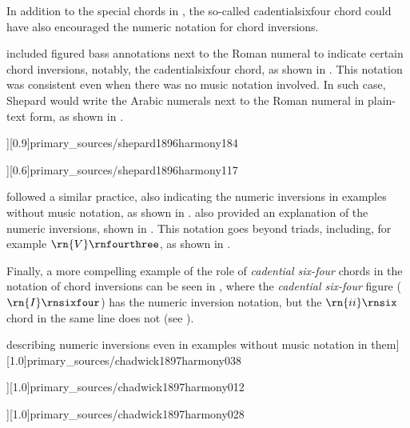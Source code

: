 In addition to the special chords in
\textcite{emery1879elements}, the so-called
\gls{cadentialsixfour} chord could have also encouraged the
numeric notation for chord inversions.

\textcite{shepard1896harmony} included figured bass
annotations next to the Roman numeral to indicate certain
chord inversions, notably, the \gls{cadentialsixfour} chord,
as shown in .
This notation was consistent even when there was no music
notation involved. In such case, Shepard would write the
Arabic numerals next to the Roman numeral in plain-text
form, as shown in
.

\phdfigure[Numeric inversions in
\textcite[p.~184]{shepard1896harmony}][0.9]{primary_sources/shepard1896harmony184}

\phdfigure[Numeric inversions in plain-text, without
accompanying music notation
\parencite[p.~117]{shepard1896harmony}][0.6]{primary_sources/shepard1896harmony117}

\textcite{chadwick1897harmony} followed a similar practice,
also indicating the numeric inversions in examples without
music notation, as shown in
.
\textcite{chadwick1897harmony} also provided an explanation
of the numeric inversions, shown in
. This
notation goes beyond triads, including, for example
$\rn{V}\rnfourthree$, as shown in
.

Finally, a more compelling example of the role of
\emph{cadential six-four} chords in the notation of chord
inversions can be seen in \textcite{loewengard1908lehrbuch},
where the \emph{cadential six-four} figure
($\rn{I}\rnsixfour$) has the numeric inversion notation, but
the $\rn{ii}\rnsix$ chord in the same line does not (see
).

\phdfigure[\textcite[p.~38]{chadwick1897harmony} describing
numeric inversions even in examples without music notation
in them][1.0]{primary_sources/chadwick1897harmony038}

\phdfigure[Arabic-numeral inversions in
 \textcite[p.~12]{chadwick1897harmony}][1.0]{primary_sources/chadwick1897harmony012}

\phdfigure[A dominant seventh chord in second inversion in
\textcite[p.~28]{chadwick1897harmony}][1.0]{primary_sources/chadwick1897harmony028}

